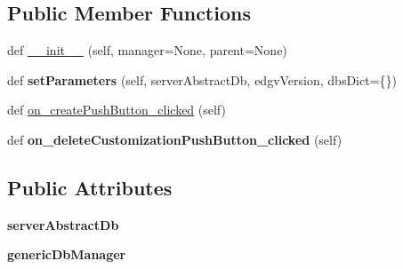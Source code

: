 \subsection*{Public Member Functions}
\begin{DoxyCompactItemize}
\item 
def \mbox{\hyperlink{class_dsg_tools_1_1_custom_widgets_1_1customization_manager_widget_1_1_customization_manager_widget_a0973cd5c6f6b4f5ce9f0be7c95856bea}{\+\_\+\+\_\+init\+\_\+\+\_\+}} (self, manager=None, parent=None)
\item 
\mbox{\label{class_dsg_tools_1_1_custom_widgets_1_1customization_manager_widget_1_1_customization_manager_widget_a821857dda59e21cf510c01eab46988fb}} 
def {\bfseries set\+Parameters} (self, server\+Abstract\+Db, edgv\+Version, dbs\+Dict=\{\})
\item 
def \mbox{\hyperlink{class_dsg_tools_1_1_custom_widgets_1_1customization_manager_widget_1_1_customization_manager_widget_a8374e5841867eb5478eb75a4a404b810}{on\+\_\+create\+Push\+Button\+\_\+clicked}} (self)
\item 
\mbox{\label{class_dsg_tools_1_1_custom_widgets_1_1customization_manager_widget_1_1_customization_manager_widget_a9b2539878ac82454be5f1a702269210d}} 
def {\bfseries on\+\_\+delete\+Customization\+Push\+Button\+\_\+clicked} (self)
\end{DoxyCompactItemize}
\subsection*{Public Attributes}
\begin{DoxyCompactItemize}
\item 
\mbox{\label{class_dsg_tools_1_1_custom_widgets_1_1customization_manager_widget_1_1_customization_manager_widget_aabe62797de5c062921f5971e0a8daf0f}} 
{\bfseries server\+Abstract\+Db}
\item 
\mbox{\label{class_dsg_tools_1_1_custom_widgets_1_1customization_manager_widget_1_1_customization_manager_widget_a302885a05eb0b1600468b6b8ad415b04}} 
{\bfseries generic\+Db\+Manager}
\end{DoxyCompactItemize}
